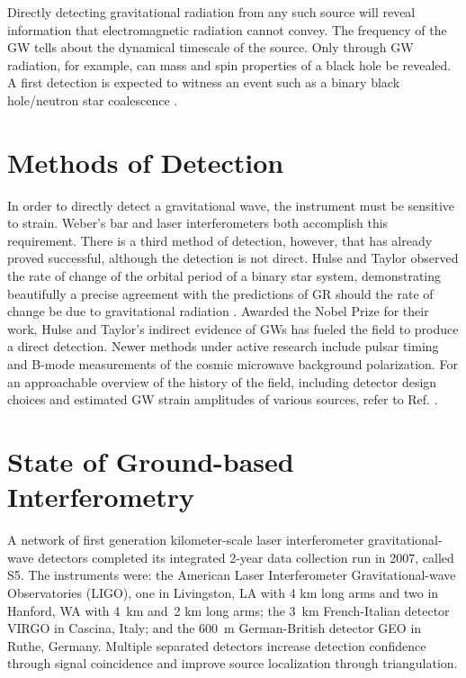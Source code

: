 Directly detecting gravitational radiation from any such source will
reveal information that electromagnetic radiation cannot convey. The
frequency of the GW tells about the dynamical timescale of the
source. Only through GW radiation, for example, can mass and spin
properties of a black hole be revealed. A first detection is expected
to witness an event such as a binary black hole/neutron star
coalescence \cite{Abadie2010Predictions}.





\section{Methods of Detection}
In order to directly detect a gravitational wave, the instrument must
be sensitive to strain. Weber's bar and laser interferometers both
accomplish this requirement. There is a third method of detection,
however, that has already proved successful, although the detection is
not direct. Hulse and Taylor observed the rate of change of the
orbital period of a binary star system, demonstrating beautifully a
precise agreement with the predictions of GR should the rate of change
be due to gravitational radiation \cite{Hulse1975Discovery,
  Weisberg2005Relativistic}. Awarded the Nobel Prize for their work,
Hulse and Taylor's indirect evidence of GWs has fueled the field to
produce a direct detection. Newer methods under active research
include pulsar timing \cite{Hobbs2009International} and B-mode
measurements of the cosmic microwave background polarization. For an
approachable overview of the history of the field, including detector
design choices and estimated GW strain amplitudes of various sources,
refer to Ref. \cite{Linsay1983Study}.






\section{State of Ground-based Interferometry}
A network of first generation kilometer-scale laser interferometer
gravitational-wave detectors completed its integrated 2-year data
collection run in 2007, called S5. The instruments were: the American
Laser Interferometer Gravitational-wave Observatories (LIGO)\cite{Abbott2009LIGO},
one in Livingston, LA with 4 km long arms and two in Hanford, WA with
4~km and~2 km long arms; the 3~km French-Italian detector
VIRGO\cite{Acernese2008Virgo} in Cascina, Italy; and the 600~m
German-British detector GEO\cite{Luck2006Status} in Ruthe, Germany. Multiple
separated detectors increase detection confidence through signal
coincidence and improve source localization through triangulation.

